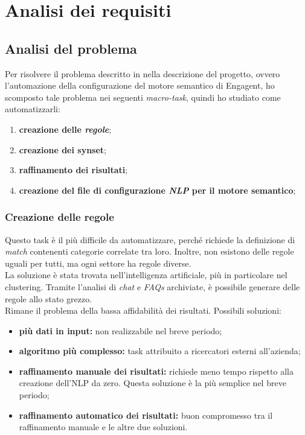 
\chapter{Analisi dei requisiti}
\label{cap:analisi-requisiti}

\section{Analisi del problema}
Per risolvere il problema descritto in nella descrizione del progetto, ovvero l'automazione della configurazione del motore semantico di Engagent, ho scomposto tale problema nei seguenti \textit{macro-task}, quindi ho studiato come automatizzarli:
\begin{enumerate}
    \item \textbf{creazione delle \emph{regole}\glsfirstoccur};
    \item \textbf{creazione dei synset};
    \item \textbf{raffinamento dei risultati};
    \item \textbf{creazione del file di configurazione \emph{NLP} per il motore semantico};
\end{enumerate}

\subsection*{Creazione delle regole}\label{creazione_regole}
Questo task è il più difficile da automatizzare, perché richiede la definizione di \emph{match} contenenti categorie correlate tra loro. Inoltre, non esistono delle regole uguali per tutti, ma ogni settore ha regole diverse.\\
La soluzione è stata trovata nell'intelligenza artificiale, più in particolare nel clustering. Tramite l'analisi di \emph{chat} e \textit{FAQs}\glsfirstoccur{} archiviate, è possibile generare delle regole allo stato grezzo.\\
Rimane il problema della bassa affidabilità dei risultati. Possibili soluzioni:
\begin{itemize}
    \item \textbf{più dati in input:} non realizzabile nel breve periodo;
    \item \textbf{algoritmo più complesso:} task attribuito a ricercatori esterni all'azienda;
    \item \textbf{raffinamento manuale dei risultati:} richiede meno tempo rispetto alla creazione dell'NLP da zero. Questa soluzione è la più semplice nel breve periodo; 
    \item \textbf{raffinamento automatico dei risultati:} buon compromesso tra il raffinamento manuale e le altre due soluzioni.
\end{itemize}

